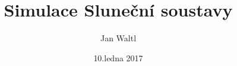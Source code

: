 \documentclass[a4paper,hidelinks]{report}
\title{Simulace Sluneční soustavy}
\date{10.ledna 2017}
\author{Jan Waltl}
\begin{document}
	
	\newpage
	\tableofcontents
	\lstlistoflistings
	\newpage
	
	
	
	
	
	
	
	
	
	

	
\end{document}
